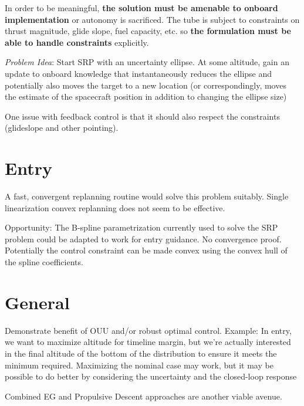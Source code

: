 \documentclass[10pt,a4paper]{article}
\begin{document}
	In order to be meaningful, \textbf{the solution must be amenable to onboard implementation} or autonomy is sacrificed. The tube is subject to constraints on thrust magnitude, glide slope, fuel capacity, etc. so \textbf{the formulation must be able to handle constraints} explicitly.
	
	\textit{Problem Idea}: Start SRP with an uncertainty ellipse. At some altitude, gain an update to onboard knowledge that instantaneously reduces the ellipse and potentially also moves the target to a new location (or correspondingly, moves the estimate of the spacecraft position in addition to changing the ellipse size)
	
	One issue with feedback control is that it should also respect the constraints (glideslope and other pointing). 
	
	
	\section{Entry}
	A fast, convergent replanning routine would solve this problem suitably. Single linearization convex replanning does not seem to be effective. 
	
	Opportunity: The B-spline parametrization currently used to solve the SRP problem could be adapted to work for entry guidance. No convergence proof. Potentially the control constraint can be made convex using the convex hull of the spline coefficients. 
	
	\section{General}
	Demonstrate benefit of OUU and/or robust optimal control. 
	Example: In entry, we want to maximize altitude for timeline margin, but we're actually interested in the final altitude of the bottom of the distribution to ensure it meets the minimum required. Maximizing the nominal case may work, but it may be possible to do better by considering the uncertainty and the closed-loop response
	
	Combined EG and Propulsive Descent approaches are another viable avenue. 

	
	\begin{thebibliography}{1}

		
	\end{thebibliography}
\end{document}
